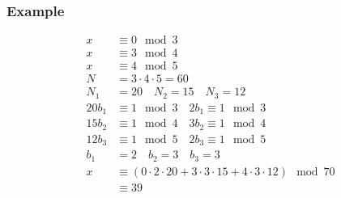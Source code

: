 \documentclass{math}
\begin{document}
\subsubsection*{Example}
\begin{align*}
  x &\equiv 0\mod3 \\
  x &\equiv 3\mod4 \\
  x &\equiv 4\mod5 \\
  N &= 3\cdot4\cdot5 = 60 \\
  N_1 &= 20 \quad N_2 = 15 \quad N_3 = 12 \\
  20b_1 &\equiv 1\mod3 \quad 2b_1 \equiv 1\mod3 \\
  15b_2 &\equiv 1\mod4 \quad 3b_2 \equiv 1\mod4 \\
  12b_3 &\equiv 1\mod5 \quad 2b_3 \equiv 1\mod5 \\
  b_1 &= 2 \quad b_2 = 3 \quad b_3 = 3 \\
  x &\equiv (0\cdot2\cdot20+3\cdot3\cdot15+4\cdot3\cdot12)\mod70 \\
  &\equiv 39
\end{align*}
\end{document}
